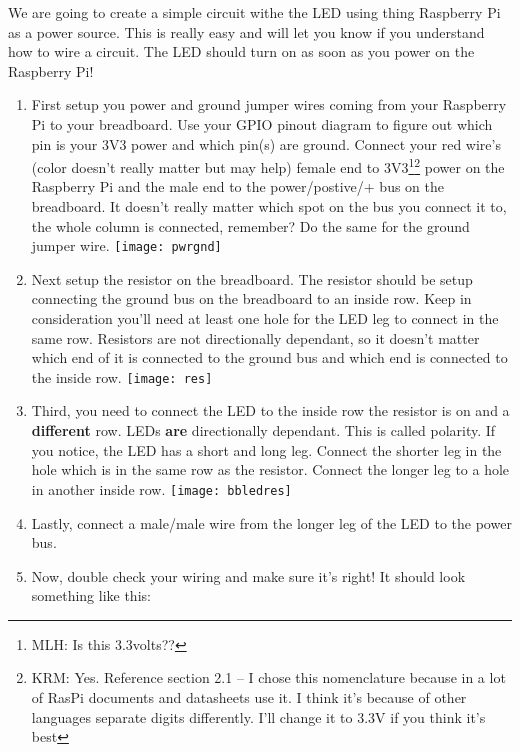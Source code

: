 \documentclass{article}\usepackage[]{graphicx}\usepackage[]{color}
\begin{document}
We are going to create a simple circuit withe the LED using thing Raspberry Pi as a power source. This is really easy and will let you know if you understand how to wire a circuit. The LED should turn on as soon as you power on the Raspberry Pi!

\begin{enumerate}
\item First setup you power and ground jumper wires coming from your Raspberry Pi to your breadboard. Use your GPIO pinout diagram to figure out which pin is your 3V3 power and which pin(s) are ground. Connect your red wire's (color doesn't really matter but may help) female end to 3V3\footnote{MLH: Is this 3.3volts??}\footnote{KRM: Yes. Reference section 2.1 -- I chose this nomenclature because in a lot of RasPi documents and datasheets use it. I think it's because of other languages separate digits differently. I'll change it to 3.3V if you think it's best} power on the Raspberry Pi and the male end to the power/postive/+ bus on the breadboard. It doesn't really matter which spot on the bus you connect it to, the whole column is connected, remember? Do the same for the ground jumper wire.
\newline
\newline
\texttt{[image: pwrgnd]}
\item Next setup the resistor on the breadboard. The resistor should be setup connecting the ground bus on the breadboard to an inside row. Keep in consideration you'll need at least one hole for the LED leg to connect in the same row. Resistors are not directionally dependant, so it doesn't matter which end of it is connected to the ground bus and which end is connected to the inside row.
\newline
\newline
\texttt{[image: res]}
\item Third, you need to connect the LED to the inside row the resistor is on and a \textbf{different} row. LEDs \textbf{are} directionally dependant. This is called polarity. If you notice, the LED has a short and long leg. Connect the shorter leg in the hole which is in the same row as the resistor. Connect the longer leg to a hole in another inside row.
\newline
\newline
\texttt{[image: bbledres]}
\item Lastly, connect a male/male wire from the longer leg of the LED to the power bus.
\item Now, double check your wiring and make sure it's right! It should look something like this:

\end{enumerate}
\end{document}
